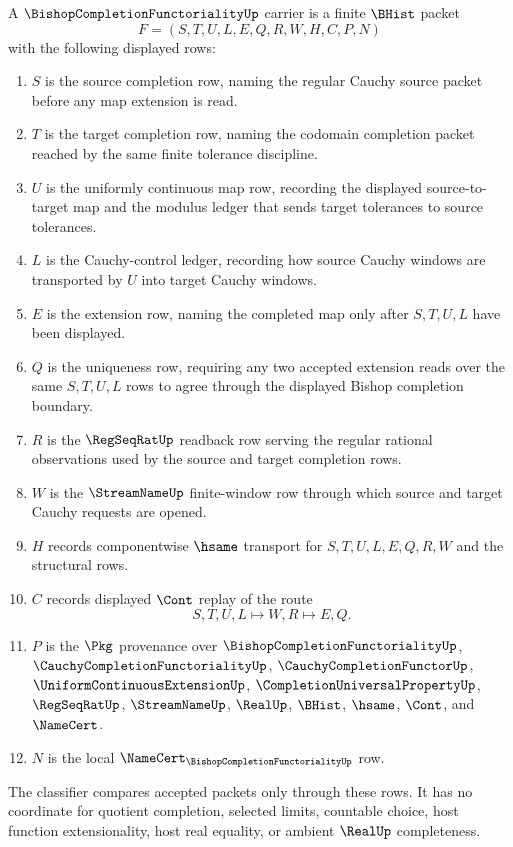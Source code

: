 \begin{definition}
\label{def:bishop-completion-functoriality-carrier}
A $\BishopCompletionFunctorialityUp$ carrier is a finite $\BHist$ packet
$$
F=(S,T,U,L,E,Q,R,W,H,C,P,N)
$$
with the following displayed rows:
\begin{enumerate}
\item $S$ is the source completion row, naming the regular Cauchy source packet before any map extension is read.
\item $T$ is the target completion row, naming the codomain completion packet reached by the same finite tolerance discipline.
\item $U$ is the uniformly continuous map row, recording the displayed source-to-target map and the modulus ledger that sends target tolerances to source tolerances.
\item $L$ is the Cauchy-control ledger, recording how source Cauchy windows are transported by $U$ into target Cauchy windows.
\item $E$ is the extension row, naming the completed map only after $S,T,U,L$ have been displayed.
\item $Q$ is the uniqueness row, requiring any two accepted extension reads over the same $S,T,U,L$ rows to agree through the displayed Bishop completion boundary.
\item $R$ is the $\RegSeqRatUp$ readback row serving the regular rational observations used by the source and target completion rows.
\item $W$ is the $\StreamNameUp$ finite-window row through which source and target Cauchy requests are opened.
\item $H$ records componentwise $\hsame$ transport for $S,T,U,L,E,Q,R,W$ and the structural rows.
\item $C$ records displayed $\Cont$ replay of the route
$$
S,T,U,L \longmapsto W,R \longmapsto E,Q .
$$
\item $P$ is the $\Pkg$ provenance over $\BishopCompletionFunctorialityUp$, $\CauchyCompletionFunctorialityUp$, $\CauchyCompletionFunctorUp$, $\UniformContinuousExtensionUp$, $\CompletionUniversalPropertyUp$, $\RegSeqRatUp$, $\StreamNameUp$, $\RealUp$, $\BHist$, $\hsame$, $\Cont$, and $\NameCert$.
\item $N$ is the local $\NameCert_{\BishopCompletionFunctorialityUp}$ row.
\end{enumerate}
The classifier compares accepted packets only through these rows. It has no coordinate for quotient completion, selected limits, countable choice, host function extensionality, host real equality, or ambient $\RealUp$ completeness.
\end{definition}

